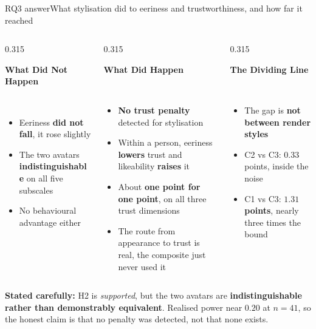 \documentclass[aspectratio=169,10pt]{beamer}
\newcommand{\hl}[1]{{\color{knblue}\textbf{#1}}}
\newcommand{\good}[1]{{\color{kngreen}\textbf{#1}}}
\newcommand{\bad}[1]{{\color{knred}\textbf{#1}}}
\newcommand{\panelhead}[1]{\noindent\colorbox{kncyan}{\parbox{0.96\textwidth}{\centering\vspace{1pt}\color{white}\scriptsize\bfseries #1\vspace{1pt}}}\\[0.25em]}
\newcommand{\panel}[1]{\noindent\colorbox{knlight}{\parbox{0.96\textwidth}{\vspace{2pt}\scriptsize
\begin{itemize}\setlength{\itemsep}{0.2em}\setlength{\leftmargini}{1.1em}#1\end{itemize}\vspace{2pt}}}}
\begin{document}
\begin{frame}{RQ3 answer}{What stylisation did to eeriness and trustworthiness, and how far it reached}
  \vspace{0.45em}
  \begin{columns}[T]
    \begin{column}{0.315\textwidth}
      \panelhead{What Did Not Happen}
      \panel{%
        \item Eeriness \bad{did not fall}, it rose slightly
        \item The two avatars \hl{indistinguishable} on all five subscales
        \item No behavioural advantage either}
    \end{column}
    \begin{column}{0.315\textwidth}
      \panelhead{What Did Happen}
      \panel{%
        \item \good{No trust penalty} detected for stylisation
        \item Within a person, eeriness \bad{lowers} trust and likeability \good{raises} it
        \item About \hl{one point for one point}, on all three trust dimensions
        \item The route from appearance to trust is real, the composite just never used it}
    \end{column}
    \begin{column}{0.315\textwidth}
      \panelhead{The Dividing Line}
      \panel{%
        \item The gap is \hl{not between render styles}
        \item C2 vs C3: $0.33$ points, inside the noise
        \item C1 vs C3: \bad{$1.31$ points}, nearly three times the bound}
    \end{column}
  \end{columns}
  \vfill
  \noindent\colorbox{knlight}{\parbox{0.975\textwidth}{\scriptsize\color{knblue}
  \textbf{Stated carefully:} H2 is \emph{supported}, but the two avatars are \textbf{indistinguishable rather than demonstrably equivalent}. Realised power near $0.20$ at $n=41$, so the honest claim is that no penalty was detected, not that none exists.}}
\end{frame}

\end{document}
